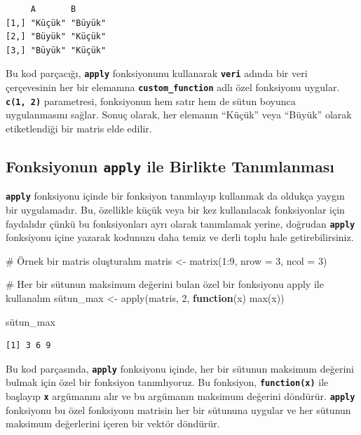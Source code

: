 \documentclass[
  letterpaper,
  DIV=11,
  numbers=noendperiod]{scrreprt}
\newenvironment{Shaded}{\begin{snugshade}}{\end{snugshade}}
\newcommand{\AttributeTok}[1]{\textcolor[rgb]{0.40,0.45,0.13}{#1}}
\newcommand{\CommentTok}[1]{\textcolor[rgb]{0.37,0.37,0.37}{#1}}
\newcommand{\ControlFlowTok}[1]{\textcolor[rgb]{0.00,0.23,0.31}{\textbf{#1}}}
\newcommand{\DecValTok}[1]{\textcolor[rgb]{0.68,0.00,0.00}{#1}}
\newcommand{\FunctionTok}[1]{\textcolor[rgb]{0.28,0.35,0.67}{#1}}
\newcommand{\NormalTok}[1]{\textcolor[rgb]{0.00,0.23,0.31}{#1}}
\newcommand{\OtherTok}[1]{\textcolor[rgb]{0.00,0.23,0.31}{#1}}
\newcommand{\SpecialCharTok}[1]{\textcolor[rgb]{0.37,0.37,0.37}{#1}}
\begin{document}
\begin{verbatim}
     A       B      
[1,] "Küçük" "Büyük"
[2,] "Büyük" "Küçük"
[3,] "Büyük" "Küçük"
\end{verbatim}

Bu kod parçacığı, \textbf{\texttt{apply}} fonksiyonunu kullanarak
\textbf{\texttt{veri}} adında bir veri çerçevesinin her bir elemanına
\textbf{\texttt{custom\_function}} adlı özel fonksiyonu uygular.
\textbf{\texttt{c(1,\ 2)}} parametresi, fonksiyonun hem satır hem de
sütun boyunca uygulanmasını sağlar. Sonuç olarak, her elemanın ``Küçük''
veya ``Büyük'' olarak etiketlendiği bir matris elde edilir.

\subsection{\texorpdfstring{Fonksiyonun \textbf{\texttt{apply}} ile
Birlikte
Tanımlanması}{Fonksiyonun apply ile Birlikte Tanımlanması}}\label{fonksiyonun-apply-ile-birlikte-tanux131mlanmasux131}

\textbf{\texttt{apply}} fonksiyonu içinde bir fonksiyon tanımlayıp
kullanmak da oldukça yaygın bir uygulamadır. Bu, özellikle küçük veya
bir kez kullanılacak fonksiyonlar için faydalıdır çünkü bu fonksiyonları
ayrı olarak tanımlamak yerine, doğrudan \textbf{\texttt{apply}}
fonksiyonu içine yazarak kodunuzu daha temiz ve derli toplu hale
getirebilirsiniz.

\begin{Shaded}
\begin{Highlighting}[]
\CommentTok{\# Örnek bir matris oluşturalım}
\NormalTok{matris }\OtherTok{\textless{}{-}} \FunctionTok{matrix}\NormalTok{(}\DecValTok{1}\SpecialCharTok{:}\DecValTok{9}\NormalTok{, }\AttributeTok{nrow =} \DecValTok{3}\NormalTok{, }\AttributeTok{ncol =} \DecValTok{3}\NormalTok{)}

\CommentTok{\# Her bir sütunun maksimum değerini bulan özel bir fonksiyonu apply ile kullanalım}
\NormalTok{sütun\_max }\OtherTok{\textless{}{-}} \FunctionTok{apply}\NormalTok{(matris, }\DecValTok{2}\NormalTok{, }\ControlFlowTok{function}\NormalTok{(x) }\FunctionTok{max}\NormalTok{(x))}

\NormalTok{sütun\_max}
\end{Highlighting}
\end{Shaded}

\begin{verbatim}
[1] 3 6 9
\end{verbatim}

Bu kod parçasında, \textbf{\texttt{apply}} fonksiyonu içinde, her bir
sütunun maksimum değerini bulmak için özel bir fonksiyon tanımlıyoruz.
Bu fonksiyon, \textbf{\texttt{function(x)}} ile başlayıp
\textbf{\texttt{x}} argümanını alır ve bu argümanın maksimum değerini
döndürür. \textbf{\texttt{apply}} fonksiyonu bu özel fonksiyonu matrisin
her bir sütununa uygular ve her sütunun maksimum değerlerini içeren bir
vektör döndürür.
\end{document}
